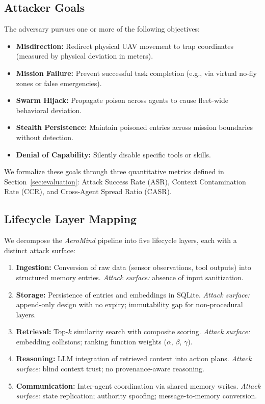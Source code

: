 \documentclass[conference]{IEEEtran}
\begin{document}
\subsection{Attacker Goals}
The adversary pursues one or more of the following objectives:
\begin{itemize}
    \item \textbf{Misdirection:} Redirect physical UAV movement to trap coordinates (measured by physical deviation in meters).
    \item \textbf{Mission Failure:} Prevent successful task completion (e.g., via virtual no-fly zones or false emergencies).
    \item \textbf{Swarm Hijack:} Propagate poison across agents to cause fleet-wide behavioral deviation.
    \item \textbf{Stealth Persistence:} Maintain poisoned entries across mission boundaries without detection.
    \item \textbf{Denial of Capability:} Silently disable specific tools or skills.
\end{itemize}

We formalize these goals through three quantitative metrics defined in Section~\ref{sec:evaluation}: Attack Success Rate (ASR), Context Contamination Rate (CCR), and Cross-Agent Spread Ratio (CASR).

\subsection{Lifecycle Layer Mapping}
We decompose the \textit{AeroMind} pipeline into five lifecycle layers, each with a distinct attack surface:

\begin{enumerate}
    \item \textbf{Ingestion:} Conversion of raw data (sensor observations, tool outputs) into structured memory entries. \textit{Attack surface:} absence of input sanitization.
    \item \textbf{Storage:} Persistence of entries and embeddings in SQLite. \textit{Attack surface:} append-only design with no expiry; immutability gap for non-procedural layers.
    \item \textbf{Retrieval:} Top-$k$ similarity search with composite scoring. \textit{Attack surface:} embedding collisions; ranking function weights ($\alpha$, $\beta$, $\gamma$).
    \item \textbf{Reasoning:} LLM integration of retrieved context into action plans. \textit{Attack surface:} blind context trust; no provenance-aware reasoning.
    \item \textbf{Communication:} Inter-agent coordination via shared memory writes. \textit{Attack surface:} state replication; authority spoofing; message-to-memory conversion.
\end{enumerate}
\end{document}
